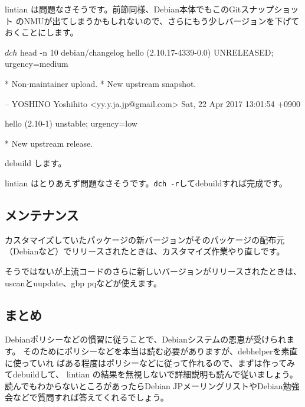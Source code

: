 \documentclass[mingoth,a4paper]{jsarticle}
\begin{document}
lintian は問題なさそうです。前節同様、Debian本体でもこのGitスナップショット
のNMUが出てしまうかもしれないので、さらにもう少しバージョンを下げておくことにします。

\begin{commandline}
$ dch
$ head -n 10 debian/changelog
hello (2.10.17-4339-0.0) UNRELEASED; urgency=medium

  * Non-maintainer upload.
  * New upstream snapshot.

 -- YOSHINO Yoshihito <yy.y.ja.jp@gmail.com>  Sat, 22 Apr 2017 13:01:54 +0900

hello (2.10-1) unstable; urgency=low

  * New upstream release.
\end{commandline}

debuild します。


lintian はとりあえず問題なさそうです。\verb|dch -r|してdebuildすれば完成です。

\subsection{メンテナンス}

カスタマイズしていたパッケージの新バージョンがそのパッケージの配布元
（Debianなど）でリリースされたときは、カスタマイズ作業やり直しです。

そうではないが上流コードのさらに新しいバージョンがリリースされたときは、
uscanとuupdate、gbp pqなどが使えます。

\subsection{まとめ}

Debianポリシーなどの慣習に従うことで、Debianシステムの恩恵が受けられます。
そのためにポリシーなどを本当は読む必要がありますが、debhelperを素直に使っていれ
ばある程度はポリシーなどに従って作れるので、まずは作ってみてdebuildして、
lintian の結果を無視しないで詳細説明も読んで従いましょう。
読んでもわからないところがあったらDebian JPメーリングリストやDebian勉強
会などで質問すれば答えてくれるでしょう。
\end{document}

